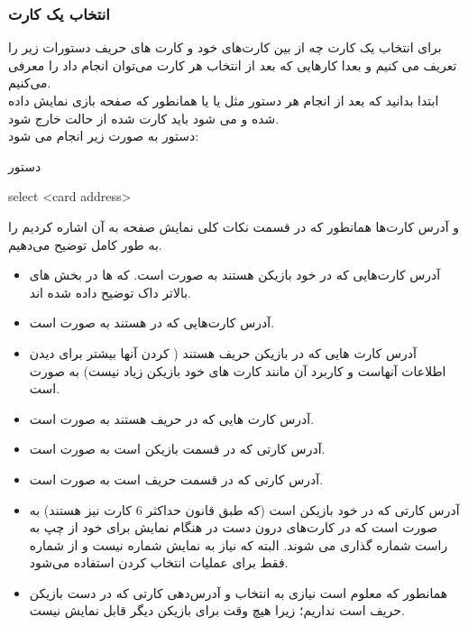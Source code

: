 \documentclass[]{article}
\begin{document}
\subsubsection*{{\titr انتخاب یک کارت}}
برای انتخاب یک کارت چه از بین کارت‌های خود و کارت های حریف دستورات زیر را 
تعریف می کنیم و بعدا کارهایی که بعد از انتخاب هر کارت می‌توان انجام داد را 
معرفی می‌کنیم.
\\
ابتدا بدانید که بعد از انجام هر دستور مثل  یا  یا 
 همانطور که صفحه بازی نمایش داده شده و  می شود باید 
کارت  شده از حالت  خارج شود.
\\
دستور  به صورت زیر انجام می شود:
\begin{mybox}[colback=yellow]{دستور}
	\begin{latin}	
		select <card address>
	\end{latin}
\end{mybox}
و آدرس کارت‌ها همانطور که در قسمت نکات کلی نمایش صفحه به آن اشاره کردیم را 
به طور کامل توضیح می‌دهیم.
\begin{itemize}
	\item
	آدرس کارت‌هایی که در  خود بازیکن هستند به صورت
	  است. که  ها در بخش های بالاتر داک توضیح داده شده اند.
	\item
	آدرس کارت‌هایی که در  هستند به صورت
	 است. 
	\item
	آدرس کارت هایی که در  بازیکن حریف هستند ( 
	کردن آنها بیشتر برای دیدن اطلاعات آنهاست و کاربرد آن مانند کارت های 
	خود 
	بازیکن زیاد نیست) به صورت  است.
	\item
	آدرس کارت هایی که در  حریف هستند به صورت
	  است.
	\item
	آدرس کارتی که در قسمت  بازیکن است به صورت  
	است.
	\item
	آدرس کارتی که در قسمت  حریف است به صورت
	  است.
	\item
	آدرس کارتی که در  خود بازیکن است (که طبق قانون حداکثر 6 کارت 
	نیز هستند) به صورت 
	 است که  در کارت‌های درون دست در هنگام نمایش برای خود از چپ به 
	 راست شماره گذاری می شوند. البته که نیاز به نمایش شماره نیست و از 
	 شماره فقط 
	 برای عملیات انتخاب کردن استفاده می‌شود.
	 \item
	 همانطور که معلوم است نیازی به انتخاب و آدرس‌دهی کارتی که در دست بازیکن 
	 حریف است نداریم؛ زیرا هیچ وقت برای بازیکن دیگر قابل نمایش نیست.	
\end{itemize}
\end{document}
